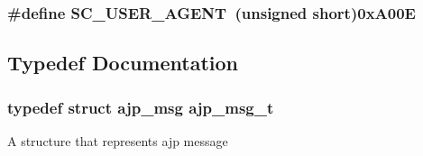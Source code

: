 \subsubsection[{\texorpdfstring{S\+C\+\_\+\+U\+S\+E\+R\+\_\+\+A\+G\+E\+NT}{SC_USER_AGENT}}]{\setlength{\rightskip}{0pt plus 5cm}\#define S\+C\+\_\+\+U\+S\+E\+R\+\_\+\+A\+G\+E\+NT~(unsigned short)0x\+A00E}\hypertarget{group__AJP__defines_ga55467117a8447ed121035b5f21ded199}{}\label{group__AJP__defines_ga55467117a8447ed121035b5f21ded199}


\subsection{Typedef Documentation}
\subsubsection[{\texorpdfstring{ajp\+\_\+msg\+\_\+t}{ajp_msg_t}}]{\setlength{\rightskip}{0pt plus 5cm}typedef struct {\bf ajp\+\_\+msg} {\bf ajp\+\_\+msg\+\_\+t}}\hypertarget{group__AJP__defines_ga863bb515e9c32a605d3833fa88d9b643}{}\label{group__AJP__defines_ga863bb515e9c32a605d3833fa88d9b643}
A structure that represents ajp message 